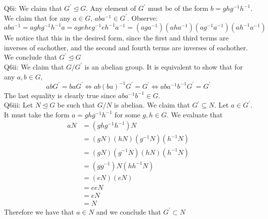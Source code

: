 \documentclass[letterpaper]{article}
\begin{document}
\noindent
Q6i: We claim that $G^\prime \trianglelefteq G$. Any element of $G^\prime$ must be of the form $b = ghg^{-1}h^{-1}$. We claim that for any $a\in G$, $aba^{-1}\in G^\prime$. Observe: 
$$aba^{-1} = a gh g^{-1}h^{-1}a = ageheg^{-1}eh^{-1}a^{-1} =(aga^{-1})(aha^{-1})(ag^{-1}a^{-1})(ah^{-1}a^{-1}) $$ We notice that this in the desired form, since the first and third terms are inverses of eachother, and the second and fourth terms are inverses of eachother. 
We conclude that $G^\prime \trianglelefteq G$
\newline \\ \noindent 
Q6ii: We claim that $G / G^\prime$ is an abelian group. It is equivalent to show that for any $a,b\in G $, $$abG^\prime = ba G^\prime \iff ab(ba)^{-1}G^\prime = G^\prime \iff aba^{-1}b^{-1}G^\prime = G^\prime$$
The last equality is clearly true since $aba^{-1}b^{-1}\in G$. 
\newline \\ \noindent 
Q6iii: Let $N\trianglelefteq G$ be such that $G / N$ is abelian. We claim that $G^\prime \subseteq N$. Let $a\in G^\prime$. It must take the form $a = ghg^{-1}h^{-1}$ for some $g,h\in G$. We evaluate that 
\begin{align*} aN &= (ghg^{-1}h^{-1})N 
    \\ & = (gN) (hN) (g^{-1}N) (h^{-1}N) 
    \\ & =(gN)(g^{-1}N)(hN)(h^{-1}N) 
    \\ & = (gg^{-1})N(hh^{-1}N) 
    \\ & = (eN)(eN)
    \\ & = eeN
    \\ &= eN 
    \\ &= N 
\end{align*}
Therefore we have that $a\in N$ and we conclude that $G^\prime \subset N$
\end{document}
